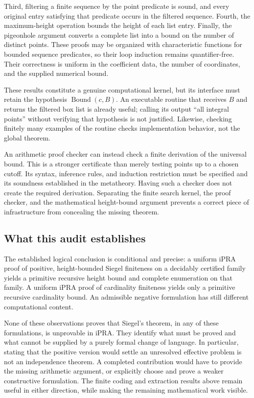 Third, filtering a finite sequence by the point predicate is sound,
and every original entry satisfying that predicate occurs in the
filtered sequence.  Fourth, the maximum-height operation bounds the
height of each list entry.  Finally, the pigeonhole argument converts
a complete list into a bound on the number of distinct points.  These
proofs may be organized with characteristic functions for bounded
sequence predicates, so their loop induction remains quantifier-free.
Their correctness is uniform in the coefficient data, the number of
coordinates, and the supplied numerical bound.

These results constitute a genuine computational kernel, but its
interface must retain the hypothesis
$\operatorname{Bound}(c,B)$.  An executable routine that receives $B$
and returns the filtered box list is already useful; calling its
output ``all integral points'' without verifying that hypothesis is
not justified.  Likewise, checking finitely many examples of the
routine checks implementation behavior, not the global theorem.

An arithmetic proof checker can instead check a finite derivation of
the universal bound.  This is a stronger certificate than merely
testing points up to a chosen cutoff.  Its syntax, inference rules,
and induction restriction must be specified and its soundness
established in the metatheory.  Having such a checker does not create
the required derivation.  Separating the finite search kernel, the
proof checker, and the mathematical height-bound argument prevents a
correct piece of infrastructure from concealing the missing theorem.

\subsection{What this audit establishes}

The established logical conclusion is conditional and precise: a
uniform iPRA proof of positive, height-bounded Siegel finiteness on a
decidably certified family yields a primitive recursive height bound
and complete enumeration on that family.  A uniform iPRA proof of
cardinality finiteness yields only a primitive recursive cardinality
bound.  An admissible negative formulation has still different
computational content.

None of these observations proves that Siegel's theorem, in any of
these formulations, is unprovable in iPRA.  They identify what must be
proved and what cannot be supplied by a purely formal change of
language.  In particular, stating that the positive version would
settle an unresolved effective problem is not an independence theorem.
A completed contribution would have to provide the missing arithmetic
argument, or explicitly choose and prove a weaker constructive
formulation.  The finite coding and extraction results above remain
useful in either direction, while making the remaining mathematical
work visible.

